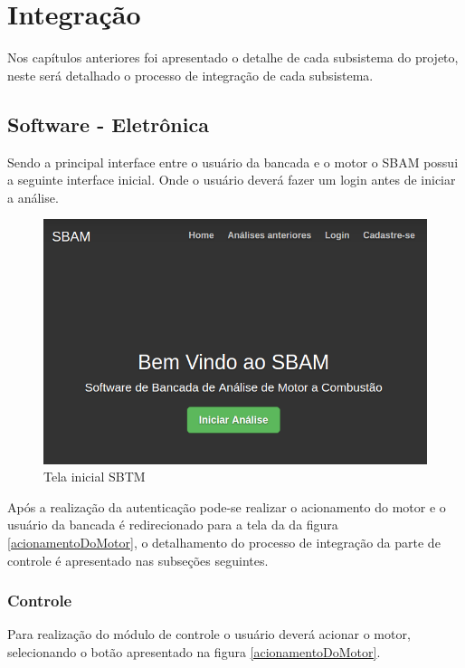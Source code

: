 \chapter{Integração}

Nos capítulos anteriores foi apresentado o detalhe de cada subsistema do projeto, neste será detalhado o processo de integração de cada subsistema.

\section{Software - Eletrônica}

Sendo a principal interface entre o usuário da bancada e o motor o SBAM possui a seguinte interface inicial.
Onde o usuário deverá fazer um login antes de iniciar a	 análise. 

\begin{figure}[h!]
	\centering
	\includegraphics[keepaspectratio=true,scale= 0.7]{figuras/SBTM-TelaInicial.png}
	\caption{Tela inicial SBTM}
	\label{telainicialSbtm}
\end{figure}

Após a realização da autenticação pode-se realizar o acionamento do motor e o usuário da bancada é redirecionado para a tela da da figura \ref{acionamentoDoMotor}, o detalhamento do processo de integração da parte de controle é apresentado nas subseções seguintes.

\subsection{Controle}

Para realização do módulo de controle o usuário deverá acionar o motor, selecionando o botão apresentado na figura \ref{acionamentoDoMotor}. 

